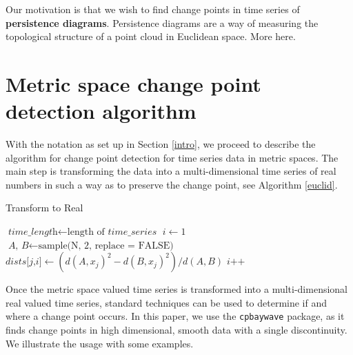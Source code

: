 \documentclass[smallextended]{svjour3}       %
\begin{document}
Our motivation is that we wish to find change points in time series of
\textbf{persistence diagrams}. Persistence diagrams are a way of
measuring the topological structure of a point cloud in Euclidean space.
More here.

\section{Metric space change point detection algorithm}\label{sec:1}

With the notation as set up in Section \ref{intro}, we proceed to
describe the algorithm for change point detection for time series data
in metric spaces. The main step is transforming the data into a
multi-dimensional time series of real numbers in such a way as to
preserve the change point, see Algorithm \ref{euclid}.

\begin{algorithm}\label{algo:1}
\caption{Transform to Real}\label{euclid}
\begin{algorithmic}[1]
\State $\textit{time\_length} \gets \text{length of }\textit{time\_series}$
\State $i \gets 1$
\State $\textit{A, B} \gets \text{sample(N, 2, replace = FALSE)}$
\State $\textit{dists[j,i]} \gets (d(A, x_j)^2 - d(B, x_j)^2)/d(A, B)$
\EndFor
\State $\textit{i++}$
\EndWhile
\EndProcedure
\end{algorithmic}
\end{algorithm}

Once the metric space valued time series is transformed into a
multi-dimensional real valued time series, standard techniques can be
used to determine if and where a change point occurs. In this paper, we
use the \texttt{cpbaywave} package, as it finds change points in high
dimensional, smooth data with a single discontinuity. We illustrate the
usage with some examples.
\end{document}
